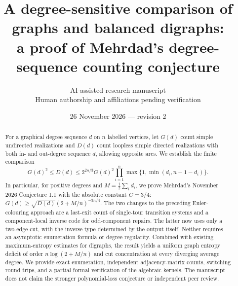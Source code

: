 \documentclass[11pt]{article}
\title{A degree-sensitive comparison of graphs and balanced digraphs:\\ a proof of Mehrdad's degree-sequence counting conjecture}
\author{AI-assisted research manuscript\\\small Human authorship and affiliations pending verification}
\date{26 November 2026 --- revision 2}
\theoremstyle{remark}\newtheorem{remark}[theorem]{Remark}
\begin{document}
\maketitle
\begin{abstract}
For a graphical degree sequence $d$ on $n$ labelled vertices, let $G(d)$ count simple undirected realizations and $D(d)$ count loopless simple directed realizations with both in- and out-degree sequence $d$, allowing opposite arcs. We establish the finite comparison
\[
 G(d)^2\le D(d)\le 2^{2n/3} G(d)^2\prod_{i=1}^n\max\{1,\min(d_i,n-1-d_i)\}.
\]
In particular, for positive degrees and $M=\tfrac12\sum_i d_i$, we prove Mehrdad's November 2026 Conjecture 1.1 with the absolute constant $C=3/4$: $G(d)\ge \sqrt{D(d)}(2+M/n)^{-3n/4}$. The two changes to the preceding Euler-colouring approach are a last-exit count of single-tour transition systems and a component-local inverse code for odd-component repairs. The latter now uses only a two-edge cut, with the inverse type determined by the output itself. Neither requires an asymptotic enumeration formula or degree regularity. Combined with existing maximum-entropy estimates for digraphs, the result yields a uniform graph entropy deficit of order $n\log(2+M/n)$ and cut concentration at every diverging average degree. We provide exact enumeration, independent adjacency-matrix counts, switching round trips, and a partial formal verification of the algebraic kernels. The manuscript does not claim the stronger polynomial-loss conjecture or independent peer review.
\end{abstract}
\end{document}
